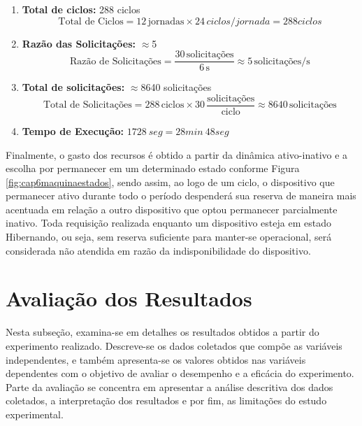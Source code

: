 \begin{enumerate}
	
	\item \textbf{Total de ciclos:} 288 ciclos
	\[
	\text{Total de Ciclos} = 12 \, \text{jornadas} \times 24 \, ciclos/jornada = 288 ciclos
	\]
	\item \textbf{Razão das Solicitações:} $\approx$5 \, 
	\[
	\text{Razão de Solicitações} = \frac{30 \, \text{solicitações}}{6 \, \text{s}} \approx 5 \, \text{solicitações/s}
	\]
	\item \textbf{Total de solicitações:} $\approx$8640 solicitações
	\[
	\text{Total de Solicitações} = 288 \, \text{ciclos} \times 30 \, \frac{\text{solicitações}}{\text{ciclo}} \approx 8640 \, \text{solicitações}
	\]
	
	\item \textbf{Tempo de Execução:} $1728 \ seg = 28min \ 48seg$	

\end{enumerate}

Finalmente, o gasto dos recursos é obtido a partir da dinâmica ativo-inativo e a escolha por permanecer em um determinado estado conforme Figura \ref{fig:cap6maquinaestados}, sendo assim, ao logo de um ciclo, o dispositivo que permanecer ativo durante todo o período despenderá sua reserva de maneira mais acentuada em relação a outro dispositivo que optou permanecer parcialmente inativo. Toda requisição realizada enquanto um dispositivo esteja em estado Hibernando, ou seja, sem reserva suficiente para manter-se operacional, será considerada não atendida em razão da indisponibilidade do dispositivo.

\section{Avaliação dos Resultados}
\label{cap6:avaliacao}



Nesta subseção, examina-se em detalhes os resultados obtidos a partir do experimento realizado. Descreve-se os dados coletados que compõe as variáveis independentes, e também apresenta-se os valores obtidos nas variáveis dependentes com o objetivo de avaliar o desempenho e a eficácia do experimento. 
Parte da avaliação se concentra em apresentar a análise descritiva dos dados coletados, a interpretação dos resultados e por fim, as limitações do estudo experimental.



